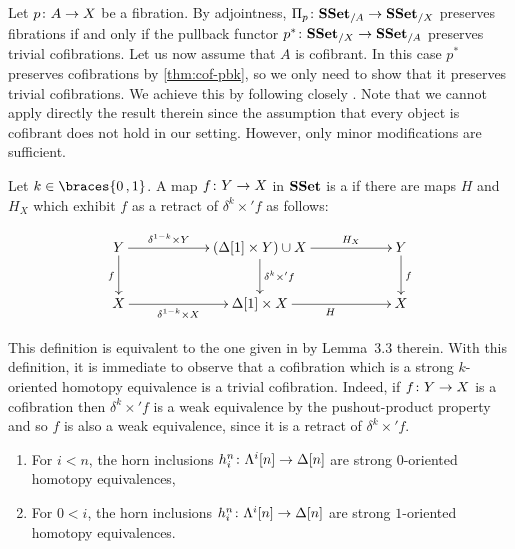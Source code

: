 \documentclass[reqno,10pt,a4paper,oneside,draft]{amsart}
\begin{document}
Let $p \colon A \rightarrow X$ be a fibration. By adjointness, $\Pi_p \colon \mathbf{SSet}_{/A} \to \mathbf{SSet}_{/X}$  preserves fibrations if and only if the pullback functor $p^* \colon \mathbf{SSet}_{/X} \to \mathbf{SSet}_{/A}$ preserves trivial cofibrations. Let us now assume that  $A$ is cofibrant. 
In this case $p^*$ preserves cofibrations by \cref{thm:cof-pbk}, so we only need to show that it preserves
trivial cofibrations. We achieve this by following closely \cite[Section~3]{gambino2017frobenius}. Note that we cannot apply directly the result therein since 
the assumption that every object is cofibrant does not hold in our setting. However, only minor modifications are sufficient.




\begin{definition} \label{def:strhtpyequiv} Let $k \in \braces{0 \, , 1 }$.
A map $f \colon Y \rightarrow X$ in $\mathbf{SSet}$ is a  if there are maps $H$ and $H_X$ which exhibit $f$ as a retract of $\delta^k \times ' f$ as follows:

\[
\xymatrix@C=2cm{
Y \ar[d]_{f} \ar[r]^-{\delta^{1-k} \times Y} & 
( \Delta[1] \times Y ) \cup X \ar[d]^{\delta^k \times' f} \ar[r]^-{H_X} & 
Y \ar[d]^{f} \\
X \ar[r]_-{\delta^{1-k} \times X}  & 
\Delta[1] \times X \ar[r]_{H} &
X  }
\]
\end{definition}

This definition is equivalent to the one given in \cite{gambino2017frobenius} by Lemma~3.3 therein.
With this definition, it is immediate to observe that a cofibration which is a strong $k$-oriented homotopy equivalence is a trivial cofibration. Indeed, if $f \colon Y \to X$ is a cofibration then $\delta^k \times ' f$ is 
a weak equivalence by the pushout-product property and so $f$ is also a weak equivalence, since it is a retract of $\delta^k \times ' f$.

\begin{lemma}\label{lemma:genTcof_strongHequiv} \hfill 
\begin{enumerate}[$(i)$]
\item For $i < n$, the horn inclusions $h^n_i \colon \Lambda^i[n] \rightarrow \Delta[n]$ are strong $0$-oriented homotopy equivalences,
\item For $0 < i $, the horn inclusions $h^n_i \colon \Lambda^i[n] \rightarrow \Delta[n]$ are strong $1$-oriented homotopy equivalences.
\end{enumerate}
\end{lemma}
\end{document}
